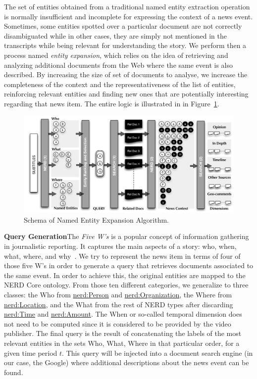 \documentclass{llncs}
\begin{document}
The set of entities obtained from a traditional named entity extraction operation is normally insufficient and incomplete for expressing the context of a news event. Sometimes, some entities spotted over a particular document are not correctly disambiguated while in other cases, they are simply not mentioned in the transcripts while being relevant for understanding the story. We perform then a process named \emph{entity expansion}, which relies on the idea of retrieving and analyzing additional documents from the Web where the same event is also described. By increasing the size of set of documents to analyse, we increase the completeness of the context and the representativeness of the list of entities, reinforcing relevant entities and finding new ones that are potentially interesting regarding that news item. The entire logic is illustrated in in Figure~\ref{fig:namedEntityExpansion}.

\begin{figure}[t!]
\centering
\includegraphics[width=1\textwidth]{figure/ExpansionDiagram}
\caption{Schema of Named Entity Expansion Algorithm.}
\label{fig:namedEntityExpansion}%
\end{figure}

\textbf{Query Generation}The \emph{Five W's} is a popular concept of information gathering in journalistic reporting. It captures the main aspects of a story: who, when, what, where, and why~\cite{LiJia2007}. We try to represent the news item in terms of four of those five W's in order to generate a query that retrieves documents associated to the same event. In order to achieve this, the original entities are mapped to the NERD Core ontology. From those ten different categories, we generalize to three classes: the Who from \url{nerd:Person} and \url{nerd:Organization}, the Where from \url{nerd:Location}, and the What from the rest of NERD types after discarding \url{nerd:Time} and \url{nerd:Amount}. The When or so-called temporal dimension does not need to be computed since it is considered to be provided by the video publisher. The final query is the result of concatenating the labels of the most relevant entities in the sets Who, What, Where in that particular order, for a given time period $t$.  
This query will be injected into a document search engine (in our case, the Google) where additional descriptions about the news event can be found.
\end{document}
